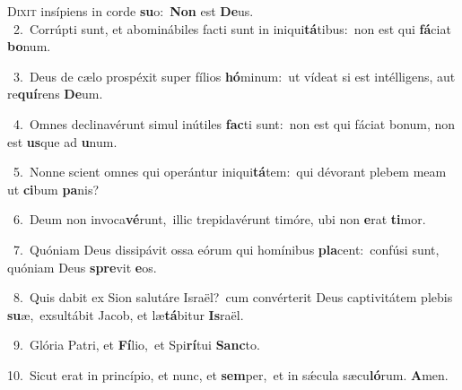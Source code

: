 \lettrine{\initial\textcolor{\initialcolor}{D}}{ixit} insípiens in corde \textbf{su}\-o:~\star \textbf{Non} est \textbf{De}\-us.\\
{\numbfont\textcolor{\numbcolor}{~2.}}~Corrúpti sunt, et abominábiles facti sunt in iniqui\-\textbf{tá}\-tibus:~\star non est qui \textbf{fá}\-ciat \textbf{bo}\-num.\par
{\numbfont\textcolor{\numbcolor}{~3.}}~Deus de cælo prospéxit super fílios \textbf{hó}\-minum:~\star ut vídeat si est intélligens, aut re\-\textbf{quí}\-rens \textbf{De}\-um.\par
{\numbfont\textcolor{\numbcolor}{~4.}}~Omnes declinavérunt simul inútiles \textbf{fac}\-ti sunt:~\star non est qui fáciat bonum, non est \textbf{us}\-que ad \textbf{u}\-num.\par
{\numbfont\textcolor{\numbcolor}{~5.}}~Nonne scient omnes qui operántur iniqui\-\textbf{tá}\-tem:~\star qui dévorant plebem meam ut \textbf{ci}\-bum \textbf{pa}\-nis?\par
{\numbfont\textcolor{\numbcolor}{~6.}}~Deum non invoca\-\textbf{vé}\-runt,~\star illic trepidavérunt timóre, ubi non \textbf{e}\-rat \textbf{ti}\-mor.\par
{\numbfont\textcolor{\numbcolor}{~7.}}~Quóniam Deus dissipávit ossa eórum qui homínibus \textbf{pla}\-cent:~\star confúsi sunt, quóniam Deus \textbf{spre}\-vit \textbf{e}\-os.\par
{\numbfont\textcolor{\numbcolor}{~8.}}~Quis dabit ex Sion salutáre Israël?~\dagger cum convérterit Deus captivitátem plebis \textbf{su}\-æ,~\star exsultábit Jacob, et læ\-\textbf{tá}\-bitur \textbf{Is}\-raël.\par
{\numbfont\textcolor{\numbcolor}{~9.}}~Glória Patri, et \textbf{Fí}\-lio,~\star et Spi\-\textbf{rí}\-tui \textbf{Sanc}\-to.\par
{\numbfont\textcolor{\numbcolor}{10.}}~Sicut erat in princípio, et nunc, et \textbf{sem}\-per,~\star et in sǽcula sæcu\-\textbf{ló}\-rum. \textbf{A}\-men.\par
